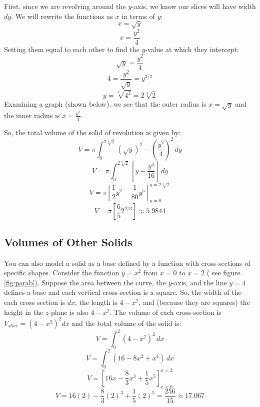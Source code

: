 \begin{Answer}[ref=volume2]
First, since we are revolving around the $y$-axis, we know our slices will 
have width $dy$. We will rewrite the functions as $x$ in terms of $y$:
$$x = \sqrt{y}$$
$$x = \frac{y^2}{4}$$
Setting them equal to each other to find the $y$-value at which they intercept:
$$\sqrt{y} = \frac{y^2}{4}$$
$$4 = \frac{y^2}{\sqrt{y}} = y^{3/2}$$
$$y = \sqrt[3]{4^2} = 2\sqrt[3]{2}$$
Examining a graph (shown below), we see that the outer radius is $x = \sqrt{y}$
and the inner radius is $x = \frac{y^2}{4}$. 


So, the total volume of the solid of revolution is given by:
$$V = \pi \int_0^{2\sqrt[3]{2}} \left(\sqrt{y} \right)^2 - \left( \frac{y^2}{4} 
\right)^2\,dy$$
$$V = \pi \int_0^{2\sqrt[3]{2}} \left[ y - \frac{y^4}{16} \right]\,dy$$
$$V = \pi \left[ \frac{1}{2}y^2 - \frac{1}{80}y^5 \right]_{y = 0}^{y = 
2\sqrt[3]{2}}$$
$$V = \pi \left[ \frac{6}{5} 2^{2/3} \right] \approx 5.9844$$
\end{Answer}

\subsection{Volumes of Other Solids}
You can also model a solid as a base defined by a function with cross-sections 
of specific shapes. Consider the function $y = x^2$ from $x = 0$ to $x = 2$ (
see figure \ref{fig:parab}). Suppose the area between the curve, the $y$-axis, 
and the line $y = 4$ defines a base and each vertical cross-section is a 
square. So, the width of the each cross section is $dx$, the length is $4 - 
x^2$, and (because they are squares) the height in the $z$-plane is also $4 - 
x^2$. The volume of each cross-section is $V_{slice} = \left(4 - x^2 
\right)^2 dx$ and the total volume of the solid is:
$$V = \int_0^2 \left(4 - x^2 \right) ^ 2\,dx$$
$$V = \int_0^2 \left( 16 - 8x^2 + x^4 \right)\,dx$$
$$V = \left[16x - \frac{8}{3}x^3 + \frac{1}{5}x^5 \right]_{x = 0}^{x = 2}$$
$$V = 16(2) - \frac{8}{3}(2)^3 + \frac{1}{5}(2)^5 = \frac{256}{15} 
\approx 17.067$$

